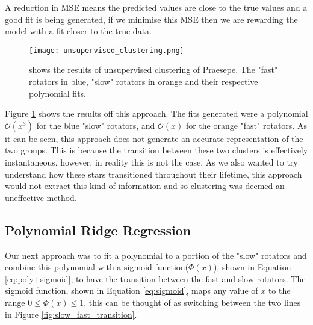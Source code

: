 \documentclass[fleqn,usenatbib]{mnras}
\begin{document}
A reduction in MSE means the predicted values are close to the true values and a good fit is being generated, if we minimise this MSE then we are rewarding the model with a fit closer to the true data.

\begin{figure}
	\texttt{[image: unsupervised\_clustering.png]}
	\caption{shows the results of unsupervised clustering of Praesepe. The "fast" rotators in blue, "slow" rotators in orange and their respective polynomial fits.}
	\label{fig:unsupervised_clustering}
\end{figure}

Figure \ref{fig:unsupervised_clustering} shows the results off this approach.
The fits generated were a polynomial $\mathcal{O}(x^3)$ for the blue "slow" rotators, and $\mathcal{O}(x)$ for the orange "fast" rotators.
As it can be seen, this approach does not generate an accurate representation of the two groups.
This is because the transition between these two clusters is effectively instantaneous, however, in reality this is not the case.
As we also wanted to try understand how these stars transitioned throughout their lifetime, this approach would not extract this kind of information and so clustering was deemed an uneffective method.

\subsection{Polynomial Ridge Regression}
Our next approach was to fit a polynomial to a portion of the "slow" rotators and combine this polynomial with a sigmoid function($\Phi\left(x\right)$), shown in Equation \ref{eq:poly+sigmoid}, to have the transition between the fast and slow rotators.
The sigmoid function, shown in Equation \ref{eq:sigmoid}, maps any value of $x$ to the range $ 0 \leq \Phi\left(x\right) \leq 1$, this can be thought of as switching between the two lines in Figure \ref{fig:slow_fast_transition}.
\end{document}
